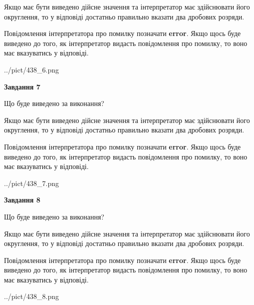 \documentclass[12pt, ukrainian]{article}
\begin{document}
{\begin {Large}
Якщо має бути виведено дійсне значення та інтерпретатор має здійснювати його округлення, 
то у відповіді достатньо правильно вказати два дробових розряди.

Повідомлення інтерпретатора про помилку позначати \textbf{error}.
Якщо щось буде виведено до того, як інтерпретатор видасть повідомлення про помилку, 
то воно має вказуватись у відповіді. \par

\begin{center}
	{../pict/438_6.png}
\end{center}
\newpage

{\begin {center}\textbf{Завдання 7}\end {center}}\par
Що буде виведено за виконання? \par

Якщо має бути виведено дійсне значення та інтерпретатор має здійснювати його округлення, 
то у відповіді достатньо правильно вказати два дробових розряди.

Повідомлення інтерпретатора про помилку позначати \textbf{error}.
Якщо щось буде виведено до того, як інтерпретатор видасть повідомлення про помилку, 
то воно має вказуватись у відповіді. \par

\begin{center}
	{../pict/438_7.png}
\end{center}
\newpage

{\begin {center}\textbf{Завдання 8}\end {center}}\par
Що буде виведено за виконання? \par

Якщо має бути виведено дійсне значення та інтерпретатор має здійснювати його округлення, 
то у відповіді достатньо правильно вказати два дробових розряди.

Повідомлення інтерпретатора про помилку позначати \textbf{error}.
Якщо щось буде виведено до того, як інтерпретатор видасть повідомлення про помилку, 
то воно має вказуватись у відповіді. \par

\begin{center}
	{../pict/438_8.png}
\end{center}
\newpage


\end{Large}}
\end{document}

